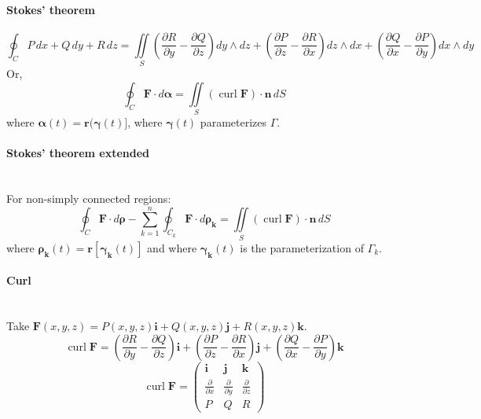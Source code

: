\documentclass[10pt]{article}
\DeclareMathOperator{\curl}{curl}
\newcommand{\bs}[1]{\pmb{#1}}
\newcommand{\parfrac}[2]{\frac{\partial #1}{\partial #2}}
\begin{document}
\paragraph{Stokes' theorem}
\begin{equation*}
\oint_C P\, dx + Q\, dy + R\, dz
= \iint\limits_S \left( \frac{\partial R}{\partial y} - \frac{\partial Q}{\partial z} \right) dy \wedge dz
+ \left( \frac{\partial P}{\partial z} - \frac{\partial R}{\partial x} \right) dz \wedge dx
+ \left( \frac{\partial Q}{\partial x} - \frac{\partial P}{\partial y} \right) dx \wedge dy
\end{equation*}
Or,
\begin{equation*}
\oint_C \bs{F} \cdot d\bs{\alpha} = \iint\limits_S (\curl \bs{F}) \cdot \bs{n}\, dS
\end{equation*}
where $\bs{\alpha}(t) = \bs{r}(\bs{\gamma}(t)]$, where $\bs{\gamma}(t)$ parameterizes $\Gamma$.

\paragraph{Stokes' theorem extended}\ \\
For non-simply connected regions:
\begin{equation*}
\oint_C\bs{F}\cdot d\bs{\rho}-\sum_{k=1}^n\oint_{C_k}\bs{F}\cdot d\bs{\rho_k}
= \iint\limits_S (\curl\bs{F})\cdot\bs{n}\, dS
\end{equation*}
where $\bs{\rho_k}(t) = \bs{r}[\bs{\gamma_k}(t)]$ and where $\bs{\gamma_k}(t)$ is the parameterization of $\Gamma_k$.

\paragraph{Curl}\ \\
Take $\bs{F}(x, y, z) = P(x, y, z)\bs{i} + Q(x, y, z)\bs{j} + R(x, y, z)\bs{k}$.
\begin{equation*}
\curl \bs{F} = \left(\parfrac{R}{y} - \parfrac{Q}{z} \right)\bs{i} + \left(\parfrac{P}{z}-\parfrac{R}{x}\right)\bs{j}+\left(\parfrac{Q}{x}-\parfrac{P}{y}\right)\bs{k}
\end{equation*}
\begin{equation*}
\curl \bs{F} = \begin{pmatrix}\bs{i}&\bs{j}&\bs{k}\\ \parfrac{}{x}&\parfrac{}{y}&\parfrac{}{z}\\ P&Q&R\end{pmatrix}
\end{equation*}
\end{document}
